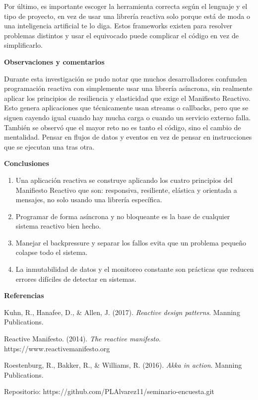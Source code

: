 \documentclass[12pt,letterpaper]{article}
\begin{document}
Por último, es importante escoger la herramienta correcta según el lenguaje y el tipo de proyecto, en vez de usar una librería reactiva solo porque está de moda o una inteligencia artificial te lo diga. Estos frameworks existen para resolver problemas distintos y usar el equivocado puede complicar el código en vez de simplificarlo.

\textbf{Observaciones y comentarios}

Durante esta investigación se pudo notar que muchos desarrolladores confunden programación reactiva con simplemente usar una librería asíncrona, sin realmente aplicar los principios de resiliencia y elasticidad que exige el Manifiesto Reactivo. Esto genera aplicaciones que técnicamente usan streams o callbacks, pero que se siguen cayendo igual cuando hay mucha carga o cuando un servicio externo falla. También se observó que el mayor reto no es tanto el código, sino el cambio de mentalidad. Pensar en flujos de datos y eventos en vez de pensar en instrucciones que se ejecutan una tras otra. 

\textbf{Conclusiones}

\begin{enumerate}[label=\arabic*.]
\item Una aplicación reactiva se construye aplicando los cuatro principios del Manifiesto Reactivo que son: responsiva, resiliente, elástica y orientada a mensajes, no solo usando una librería específica.
\item Programar de forma asíncrona y no bloqueante es la base de cualquier sistema reactivo bien hecho.
\item Manejar el backpressure y separar los fallos evita que un problema pequeño colapse todo el sistema.
\item La inmutabilidad de datos y el monitoreo constante son prácticas que reducen errores difíciles de detectar en sistemas.
\end{enumerate}


\textbf{Referencias}

Kuhn, R., Hanafee, D., \& Allen, J. (2017). \textit{Reactive design patterns}. Manning Publications.

Reactive Manifesto. (2014). \textit{The reactive manifesto}. https://www.reactivemanifesto.org

Roestenburg, R., Bakker, R., \& Williams, R. (2016). \textit{Akka in action}. Manning Publications.

\vspace{0.5cm}
\noindent \small Repositorio: https://github.com/PLAlvarez11/seminario-encuesta.git
\end{document}
